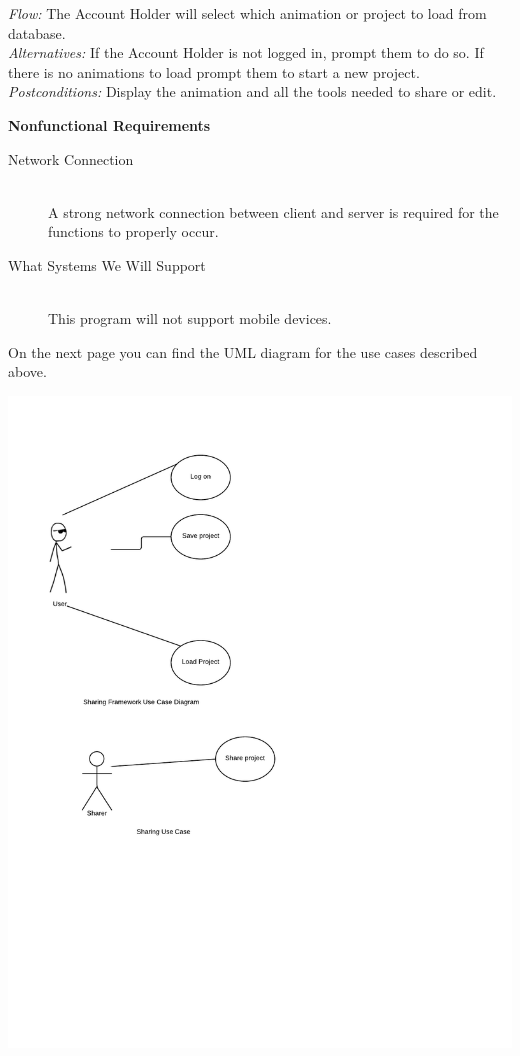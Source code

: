 \documentclass[12pt]{article}
\begin{document}
\begin{description}
\textit{Flow:} The Account Holder will select which animation or project to load from database.\\

\textit{Alternatives:} If the Account Holder is not logged in, prompt them to do so. If there is no animations to load prompt them to start a new project.\\

\textit{Postconditions:} Display the animation and all the tools needed to share or edit.\\
\end{description}

\textbf{Nonfunctional Requirements}
\begin{description}
\item[Network Connection]\hfill\\
    A strong network connection between client and server is required for the functions to properly occur.
\item[What Systems We Will Support]\hfill\\
    This program will not support mobile devices.
\end{description}

On the next page you can find the UML diagram for the use cases described above.

\begin{center}
\includegraphics[scale=1]{UMLSHaringFramework}
\end{center}
\end{document}

